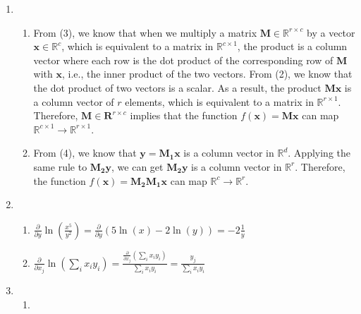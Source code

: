 \documentclass{article}
\begin{document}
\begin{enumerate}

  \item
    \begin{enumerate}
      \item From (3), we know that when we multiply a matrix $\mathbf{M}\in \mathbb{R}^{r\times c}$ by a vector $\mathbf{x}\in \mathbb{R}^{c}$, which is equivalent to a matrix in $\mathbb{R}^{c\times 1}$, the product is a column vector where each row is the dot product of the corresponding row of $\mathbf{M}$ with $\mathbf{x}$, i.e., the inner product of the two vectors.
        From (2), we know that the dot product of two vectors is a scalar.
        As a result, the product $\mathbf{M}\mathbf{x}$ is a column vector of $r$ elements, which is equivalent to a matrix in $\mathbb{R}^{r\times 1}$.
        Therefore, $\mathbf{M}\in \mathbf{R}^{r\times c}$ implies that the function $f(\mathbf{x})=\mathbf{M}\mathbf{x}$ can map $\mathbb{R}^{c\times 1} \to \mathbb{R}^{r\times 1}$.
      \item From (4), we know that $\mathbf{y}=\mathbf{M_1x}$ is a column vector in $\mathbb{R}^{d}$. Applying the same rule to $\mathbf{M_2y}$, we can get $\mathbf{M_2y}$ is a column vector in $\mathbb{R}^{r}$.
        Therefore, the function $f(\mathbf{x})=\mathbf{M_2M_1x}$ can map $\mathbb{R}^{c} \to \mathbb{R}^{r}$.
    \end{enumerate}
  \item
    \begin{enumerate}
      \item $\frac{\partial}{\partial y} \ln(\frac{x^5}{y^2})=\frac{\partial}{\partial y} (5\ln(x)-2\ln(y))=-2\frac{1}{y}$
      \item $\frac{\partial}{\partial x_j} \ln \left(\sum_i x_iy_i\right)=\frac{\frac{\partial}{\partial x_j} \left(\sum_i x_iy_i\right)}{\sum_i x_iy_i}=\frac{y_j}{\sum_i x_iy_i}$
    \end{enumerate}
  \item
    \begin{enumerate}
      \item
\end{enumerate}
\end{enumerate}
\end{document}
